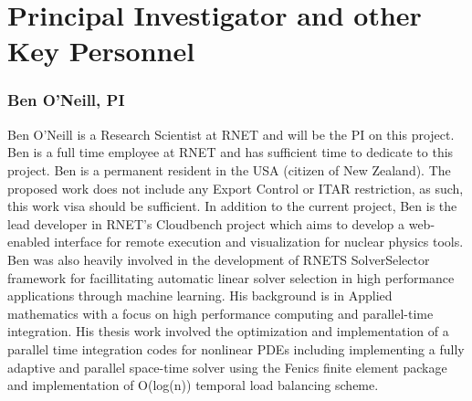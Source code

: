 \section{Principal Investigator and other Key Personnel}

\subsubsection{Ben O'Neill, PI}
Ben O'Neill is a Research Scientist at RNET and will be the PI on this project. Ben is a full time employee at
RNET and has sufficient time to dedicate to this project. Ben is a permanent resident in the USA (citizen of New Zealand). The proposed work does not include any Export Control or ITAR restriction, as such, this work visa should be sufficient. In addition to the current project, Ben is the lead developer in RNET's
Cloudbench project which aims to develop a web-enabled interface for remote execution and visualization for nuclear physics tools. Ben was also heavily involved in the development of RNETS SolverSelector framework for facillitating automatic linear solver selection in high performance applications through machine learning. His background is in Applied mathematics with a focus on high performance computing and parallel-time integration. His thesis work involved the optimization and implementation of a parallel time integration codes for nonlinear PDEs including implementing a fully adaptive and parallel space-time solver using the Fenics finite element package and implementation of O(log(n)) temporal load balancing scheme. 

